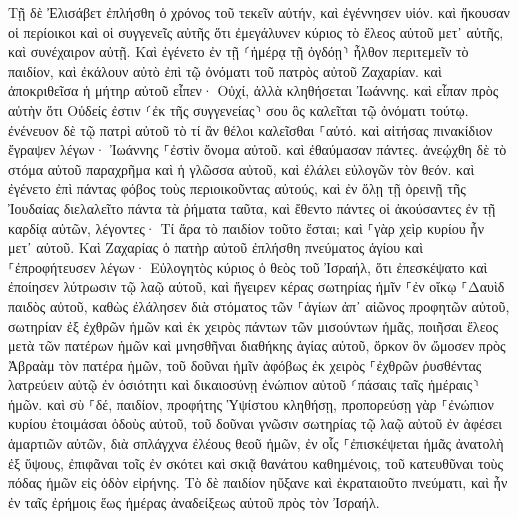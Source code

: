 \documentclass[twoside, 9pt]{extreport}
\begin{document}
Τῇ δὲ Ἐλισάβετ ἐπλήσθη ὁ χρόνος τοῦ τεκεῖν αὐτήν, καὶ ἐγέννησεν υἱόν. 
καὶ ἤκουσαν οἱ περίοικοι καὶ οἱ συγγενεῖς αὐτῆς ὅτι ἐμεγάλυνεν κύριος τὸ ἔλεος αὐτοῦ μετ᾽ αὐτῆς, καὶ συνέχαιρον αὐτῇ. 
Καὶ ἐγένετο ἐν τῇ ⸂ἡμέρᾳ τῇ ὀγδόῃ⸃ ἦλθον περιτεμεῖν τὸ παιδίον, καὶ ἐκάλουν αὐτὸ ἐπὶ τῷ ὀνόματι τοῦ πατρὸς αὐτοῦ Ζαχαρίαν. 
καὶ ἀποκριθεῖσα ἡ μήτηρ αὐτοῦ εἶπεν· Οὐχί, ἀλλὰ κληθήσεται Ἰωάννης. 
καὶ εἶπαν πρὸς αὐτὴν ὅτι Οὐδείς ἐστιν ⸂ἐκ τῆς συγγενείας⸃ σου ὃς καλεῖται τῷ ὀνόματι τούτῳ. 
ἐνένευον δὲ τῷ πατρὶ αὐτοῦ τὸ τί ἂν θέλοι καλεῖσθαι ⸀αὐτό. 
καὶ αἰτήσας πινακίδιον ἔγραψεν λέγων· Ἰωάννης ⸀ἐστὶν ὄνομα αὐτοῦ. καὶ ἐθαύμασαν πάντες. 
ἀνεῴχθη δὲ τὸ στόμα αὐτοῦ παραχρῆμα καὶ ἡ γλῶσσα αὐτοῦ, καὶ ἐλάλει εὐλογῶν τὸν θεόν. 
καὶ ἐγένετο ἐπὶ πάντας φόβος τοὺς περιοικοῦντας αὐτούς, καὶ ἐν ὅλῃ τῇ ὀρεινῇ τῆς Ἰουδαίας διελαλεῖτο πάντα τὰ ῥήματα ταῦτα, 
καὶ ἔθεντο πάντες οἱ ἀκούσαντες ἐν τῇ καρδίᾳ αὐτῶν, λέγοντες· Τί ἄρα τὸ παιδίον τοῦτο ἔσται; καὶ ⸀γὰρ χεὶρ κυρίου ἦν μετ᾽ αὐτοῦ. 
Καὶ Ζαχαρίας ὁ πατὴρ αὐτοῦ ἐπλήσθη πνεύματος ἁγίου καὶ ⸀ἐπροφήτευσεν λέγων· 
Εὐλογητὸς κύριος ὁ θεὸς τοῦ Ἰσραήλ, ὅτι ἐπεσκέψατο καὶ ἐποίησεν λύτρωσιν τῷ λαῷ αὐτοῦ, 
καὶ ἤγειρεν κέρας σωτηρίας ἡμῖν ⸀ἐν οἴκῳ ⸀Δαυὶδ παιδὸς αὐτοῦ, 
καθὼς ἐλάλησεν διὰ στόματος τῶν ⸀ἁγίων ἀπ᾽ αἰῶνος προφητῶν αὐτοῦ, 
σωτηρίαν ἐξ ἐχθρῶν ἡμῶν καὶ ἐκ χειρὸς πάντων τῶν μισούντων ἡμᾶς, 
ποιῆσαι ἔλεος μετὰ τῶν πατέρων ἡμῶν καὶ μνησθῆναι διαθήκης ἁγίας αὐτοῦ, 
ὅρκον ὃν ὤμοσεν πρὸς Ἀβραὰμ τὸν πατέρα ἡμῶν, τοῦ δοῦναι ἡμῖν 
ἀφόβως ἐκ χειρὸς ⸀ἐχθρῶν ῥυσθέντας λατρεύειν αὐτῷ 
ἐν ὁσιότητι καὶ δικαιοσύνῃ ἐνώπιον αὐτοῦ ⸂πάσαις ταῖς ἡμέραις⸃ ἡμῶν. 
καὶ σὺ ⸀δέ, παιδίον, προφήτης Ὑψίστου κληθήσῃ, προπορεύσῃ γὰρ ⸀ἐνώπιον κυρίου ἑτοιμάσαι ὁδοὺς αὐτοῦ, 
τοῦ δοῦναι γνῶσιν σωτηρίας τῷ λαῷ αὐτοῦ ἐν ἀφέσει ἁμαρτιῶν αὐτῶν, 
διὰ σπλάγχνα ἐλέους θεοῦ ἡμῶν, ἐν οἷς ⸀ἐπισκέψεται ἡμᾶς ἀνατολὴ ἐξ ὕψους, 
ἐπιφᾶναι τοῖς ἐν σκότει καὶ σκιᾷ θανάτου καθημένοις, τοῦ κατευθῦναι τοὺς πόδας ἡμῶν εἰς ὁδὸν εἰρήνης. 
Τὸ δὲ παιδίον ηὔξανε καὶ ἐκραταιοῦτο πνεύματι, καὶ ἦν ἐν ταῖς ἐρήμοις ἕως ἡμέρας ἀναδείξεως αὐτοῦ πρὸς τὸν Ἰσραήλ. 
\end{document}
